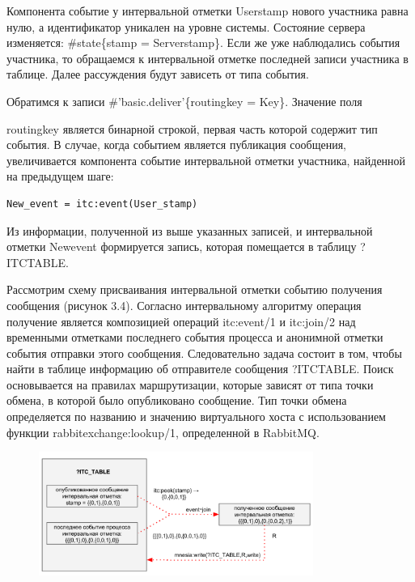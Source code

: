 Компонента событие у интервальной отметки User\underline{\hspace{0.25cm}}stamp нового участника равна нулю, а идентификатор уникален на уровне системы. Состояние сервера изменяется: \#state\{stamp = Server\underline{\hspace{0.25cm}}stamp\}. Если же уже наблюдались события участника, то обращаемся к интервальной отметке последней записи участника в таблице. Далее рассуждения будут зависеть от типа события.\par Обратимся к записи \#'basic.deliver'\{routing\underline{\hspace{0.25cm}}key = Key\}. Значение поля {routing\underline{\hspace{0.25cm}}key является бинарной строкой, первая часть которой содержит тип события. В случае, когда событием является публикация сообщения, увеличивается компонента событие интервальной отметки участника, найденной на предыдущем шаге:
\begin{lstlisting}
New_event = itc:event(User_stamp)
\end{lstlisting}
Из информации, полученной из выше указанных записей, и интервальной отметки New\underline{\hspace{0.25cm}}event формируется запись, которая помещается в таблицу ?ITC\underline{\hspace{0.25cm}}TABLE.\par
Рассмотрим схему присваивания интервальной отметки событию получения сообщения (рисунок 3.4). Согласно интервальному алгоритму операция получение является композицией операций itc:event/1 и itc:join/2 над временными отметками последнего события процесса и анонимной отметки события отправки этого сообщения. Следовательно задача состоит в том, чтобы найти в таблице информацию об отправителе сообщения ?ITC\underline{\hspace{0.25cm}}TABLE. Поиск основывается на правилах маршрутизации, которые зависят от типа точки обмена, в которой было опубликовано сообщение. Тип точки обмена определяется по названию и значению виртуального хоста с использованием функции rabbit\underline{\hspace{0.25cm}}exchange:lookup/1, определенной в RabbitMQ.
\begin{figure}
\centering
\includegraphics[width=0.8\textwidth]{img/send_recv2.png}

\end{figure}}
